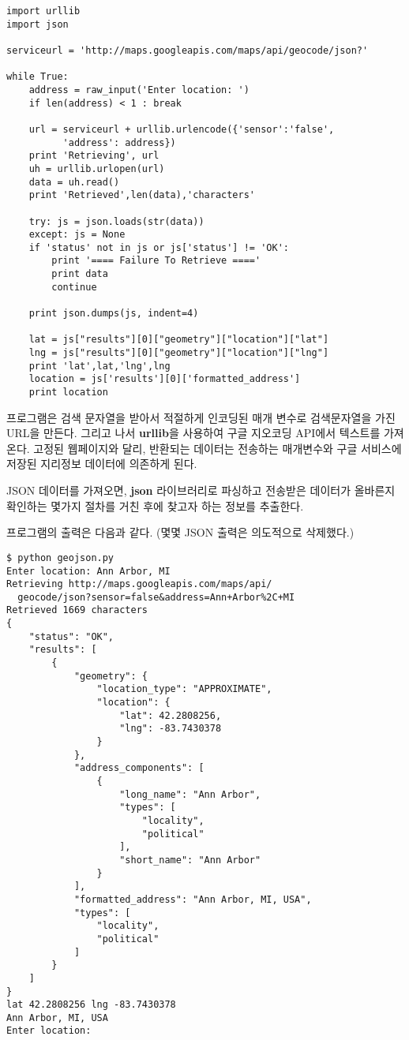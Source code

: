 \beforeverb
\begin{verbatim}
import urllib
import json

serviceurl = 'http://maps.googleapis.com/maps/api/geocode/json?'

while True:
    address = raw_input('Enter location: ')
    if len(address) < 1 : break

    url = serviceurl + urllib.urlencode({'sensor':'false', 
          'address': address})
    print 'Retrieving', url
    uh = urllib.urlopen(url)
    data = uh.read()
    print 'Retrieved',len(data),'characters'

    try: js = json.loads(str(data))
    except: js = None
    if 'status' not in js or js['status'] != 'OK':
        print '==== Failure To Retrieve ===='
        print data
        continue

    print json.dumps(js, indent=4)

    lat = js["results"][0]["geometry"]["location"]["lat"]
    lng = js["results"][0]["geometry"]["location"]["lng"]
    print 'lat',lat,'lng',lng
    location = js['results'][0]['formatted_address']
    print location
\end{verbatim}
\afterverb
%

프로그램은 검색 문자열을 받아서 적절하게 인코딩된 매개 변수로 검색문자열을 가진 URL을 만든다.
그리고 나서 {\bf urllib}을 사용하여 구글 지오코딩 API에서 텍스트를 가져온다.
고정된 웹페이지와 달리, 반환되는 데이터는 전송하는 매개변수와 구글 서비스에 저장된 지리정보 데이터에
의존하게 된다.

JSON 데이터를 가져오면, {\bf json} 라이브러리로 파싱하고 전송받은 데이터가 올바른지 확인하는 몇가지 절차를 거친 후에 찾고자 하는 정보를 추출한다.

프로그램의 출력은 다음과 같다. (몇몇 JSON 출력은 의도적으로 삭제했다.)

\beforeverb
\begin{verbatim}
$ python geojson.py
Enter location: Ann Arbor, MI
Retrieving http://maps.googleapis.com/maps/api/
  geocode/json?sensor=false&address=Ann+Arbor%2C+MI
Retrieved 1669 characters
{
    "status": "OK", 
    "results": [
        {
            "geometry": {
                "location_type": "APPROXIMATE", 
                "location": {
                    "lat": 42.2808256, 
                    "lng": -83.7430378
                }
            }, 
            "address_components": [
                {
                    "long_name": "Ann Arbor", 
                    "types": [
                        "locality", 
                        "political"
                    ], 
                    "short_name": "Ann Arbor"
                } 
            ], 
            "formatted_address": "Ann Arbor, MI, USA", 
            "types": [
                "locality", 
                "political"
            ]
        }
    ]
}
lat 42.2808256 lng -83.7430378
Ann Arbor, MI, USA
Enter location:
\end{verbatim}
\afterverb
%

